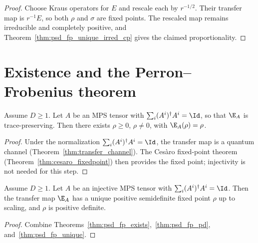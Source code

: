 \begin{proof}\leanok
    Choose Kraus operators for $E$ and rescale each by $r^{-1/2}$. Their
    transfer map is $r^{-1}E$, so both $\rho$ and $\sigma$ are fixed points.
    The rescaled map remains irreducible and completely positive, and
    Theorem~\ref{thm:psd_fp_unique_irred_cp} gives the claimed
    proportionality.
\end{proof}

\section{Existence and the Perron--Frobenius theorem}

\begin{theorem}\label{thm:psd_fp_exists}
    \leanok
    Assume $D \ge 1$. Let $A$ be an MPS tensor with
    $\sum_i (A^i)^\dagger A^i = \Id$, so that $\E_A$ is
    trace-preserving.
    Then there exists $\rho \ge 0$, $\rho \neq 0$,
    with $\E_A(\rho) = \rho$.
\end{theorem}

\begin{proof}
    \leanok
    Under the normalization $\sum_i (A^i)^\dagger A^i = \Id$,
    the transfer map is a quantum channel
    (Theorem~\ref{thm:transfer_channel}).
    The Ces\`aro fixed-point theorem
    (Theorem~\ref{thm:cesaro_fixedpoint}) then provides the
    fixed point; injectivity is not needed for this step.
\end{proof}

\begin{theorem}\label{thm:qpf}
    \leanok
    Assume $D \ge 1$. Let $A$ be an injective MPS tensor with
    $\sum_i (A^i)^\dagger A^i = \Id$.
    Then the transfer map $\E_A$ has a unique positive semidefinite fixed point
    $\rho$ up to scaling, and $\rho$ is positive definite.
\end{theorem}

\begin{proof}
    \leanok
    Combine Theorems~\ref{thm:psd_fp_exists},~\ref{thm:psd_fp_pd},
    and~\ref{thm:psd_fp_unique}.
\end{proof}

